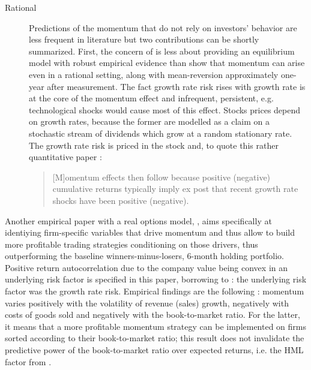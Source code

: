 \begin{description}
\item[Rational] Predictions of the momentum that do not rely on investors' behavior are less frequent in literature but two contributions can be shortly summarized. First, the concern of \cite{Johnson2002} is less about providing an equilibrium model with robust empirical evidence than show that momentum can arise even in a rational setting, along with mean-reversion approximately one-year after measurement. The fact growth rate risk rises with growth rate is at the core of the momentum effect and infrequent, persistent, e.g. technological shocks would cause most of this effect. Stocks prices depend on growth rates, because the former are modelled as a claim on a stochastic stream of dividends which grow at a random stationary rate. The growth rate risk is priced in the stock and, to quote this rather quantitative paper :
  \begin{quote}
    [M]omentum effects then follow because positive (negative) cumulative returns typically imply ex post that recent growth rate shocks have been positive (negative).
    \end{quote}
\end{description}
Another empirical paper with a real options model, \cite{Sagi2007}, aims specifically at identiying firm-specific variables that drive momentum and thus allow to build more profitable trading strategies conditioning on those drivers, thus outperforming the baseline \cite{Jegadeesh1993} winners-minus-losers, 6-month holding portfolio. Positive return autocorrelation due to the company value being convex in an underlying risk factor is specified in this paper, borrowing to \cite{Johnson2002} : the underlying risk factor was the growth rate risk. Empirical findings are the following : momentum varies positively with the volatility of revenue (sales) growth, negatively with costs of goods sold and negatively with the book-to-market ratio. For the latter, it means that a more profitable momentum strategy can be implemented on firms sorted according to their book-to-market ratio; this result does not invalidate the predictive power of the book-to-market ratio over expected returns, i.e. the HML factor from \cite{Fama1992}.

